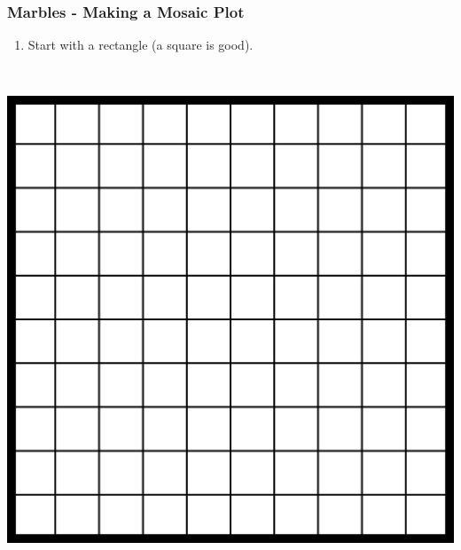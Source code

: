 \begin{frame}
\frametitle{Marbles - Making a Mosaic Plot}
\small
\begin{enumerate}
\item Start with a rectangle (a square is good).
\end{enumerate}
\\ \vfill
\begin{center}
\includegraphics[scale=0.3]{1-7_categorical_data/figures/mosaic/square.png}
\end{center}
\end{frame}

